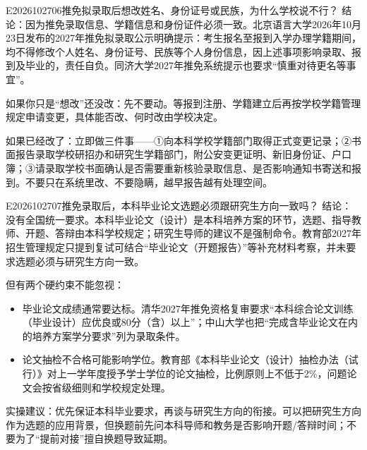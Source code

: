 \begin{qa}{E2026102706}{推免拟录取后想改姓名、身份证号或民族，为什么学校说不行？}
结论：因为推免录取信息、学籍信息和身份证件必须一致。北京语言大学2026年10月23日发布的2027年推免拟录取公示明确提示：考生报名至报到入学办理学籍期间，均不得修改个人姓名、身份证号、民族等个人身份信息，因上述事项影响录取、报到及毕业的，责任自负。同济大学2027年推免系统提示也要求“慎重对待更名等事宜”。

如果你只是“想改”还没改：先不要动。等报到注册、学籍建立后再按学校学籍管理规定申请变更，具体能否改、何时改由学校决定。

如果已经改了：立即做三件事——①向本科学校学籍部门取得正式变更记录；②书面报告录取学校研招办和研究生学籍部门，附公安变更证明、新旧身份证、户口簿；③请录取学校书面确认是否需要重新核验录取信息、是否影响通知书寄送和报到。不要只在系统里改、不要隐瞒，越早报告越有处理空间。
\end{qa}


\begin{qa}{E2026102707}{推免录取后，本科毕业论文选题必须跟研究生方向一致吗？}
结论：没有全国统一要求。本科毕业论文（设计）是本科培养方案的环节，选题、指导教师、开题、答辩由本科学校规定；研究生导师的建议不是强制命令。教育部2027年招生管理规定只提到复试可结合“毕业论文（开题报告）”等补充材料考察，并未要求选题必须与研究生方向一致。

但有两个硬约束不能忽视：
\begin{itemize}
  \item 毕业论文成绩通常要达标。清华2027年推免资格复审要求“本科综合论文训练（毕业设计）应优良或80分（含）以上”；中山大学也把“完成含毕业论文在内的培养方案学分要求”列为录取条件。
  \item 论文抽检不合格可能影响学位。教育部《本科毕业论文（设计）抽检办法（试行）》对上一学年度授予学士学位的论文抽检，比例原则上不低于2\%，问题论文会按省级细则和学校规定处理。
\end{itemize}

实操建议：优先保证本科毕业要求，再谈与研究生方向的衔接。可以把研究生方向作为选题的应用背景，但换题前先问本科导师和教务是否影响开题/答辩时间；不要为了“提前对接”擅自换题导致延期。
\end{qa}


